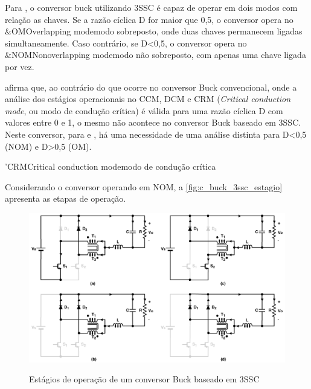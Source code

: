             Para , o conversor buck utilizando 3SSC é capaz de operar em dois modos com relação as chaves. Se a razão cíclica D for maior que 0,5, o conversor opera no \abreviatura&{OM}{Overlapping mode}{modo sobreposto}, onde duas chaves permanecem ligadas simultaneamente. Caso contrário, se D<0,5, o conversor opera no \abreviatura&{NOM}{Nonoverlapping mode}{modo não sobreposto}, com apenas uma chave ligada por vez.
            
             afirma que, ao contrário do que ocorre no conversor Buck convencional, onde a análise dos estágios operacionais no CCM, DCM e CRM (\textit{Critical conduction mode}, ou modo de condução crítica) é válida para uma razão cíclica D com valores entre 0 e 1, o mesmo não acontece no conversor Buck baseado em 3SSC. Neste conversor, para  e , há uma necessidade de uma análise distinta para D<0,5 (NOM) e D>0,5 (OM). 
            
            \abreviatura'{CRM}{Critical conduction mode}{modo de condução crítica}
            
            Considerando o conversor operando em NOM, a \autoref{fig:c_buck_3ssc_estagio} apresenta as etapas de operação.
            
            \begin{figure}[H]
            	\centering
            	\caption{Estágios de operação de um conversor Buck baseado em 3SSC}
            	\includegraphics[scale=.7]{pdf/interleaved/estag_oper_3ssc.pdf}
            	\label{fig:c_buck_3ssc_estagio}
            \end{figure}
            
